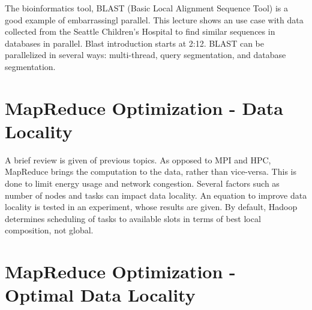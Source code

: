 The bioinformatics tool, BLAST (Basic Local Alignment Sequence Tool) is a good
example of embarrassingl parallel.  This lecture shows an use case with data
collected from the Seattle Children's Hospital to find similar sequences in
databases in parallel. Blast introduction starts at 2:12. BLAST can be
parallelized in several ways: multi-thread, query segmentation, and database
segmentation. 




\section{MapReduce Optimization - Data Locality}

A brief review is given of previous topics. As opposed to MPI and HPC,
MapReduce brings the computation to the data, rather than vice-versa.
This is done to limit energy usage and network congestion. Several
factors such as number of nodes and tasks can impact data locality. An
equation to improve data locality is tested in an experiment, whose
results are given. By default, Hadoop determines scheduling of tasks to
available slots in terms of best local composition, not global.


\section{MapReduce Optimization - Optimal Data Locality}

